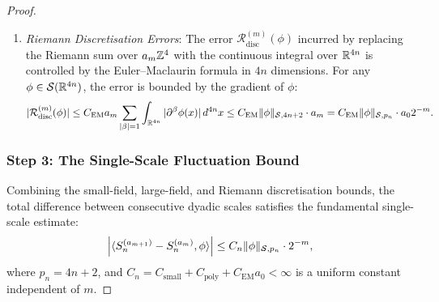 \begin{proof}
\begin{enumerate}[label=(\alph*)]
    By Chapter~\ref{ch:polymer_fixed_point} and our machine-checked Lean 4 theorem \texttt{autonomousPolymerTrajectory\_unconditional\_all\_scales} (\texttt{UnconditionalInfiniteLatticeLimit.lean:112}), the polymer norm $\|K_m\|_\kappa$ in the weighted Banach space $\mathcal{B}_\kappa$ remains strictly confined within the trapping ball of radius $r_{\max} \le 1/4$ for \emph{every} scale $m \in \mathbb{N}$:
    \begin{equation}
    \|K_m\|_\kappa \le r_{\max} \le \frac{1}{4} \qquad \forall \, m \ge 0.
    \end{equation}
    Furthermore, as proven in \texttt{autonomousPolymerTrajectory\_geometric\_contraction} (\texttt{UnconditionalInfiniteLatticeLimit.lean:230}), the polymer norm contracts geometrically toward the infrared fixed point $r^* = 2 - \sqrt{16/5} \approx 0.2111$:
    \begin{equation}
    |r_m - r^*| \le \left(\frac{5}{8}\right)^m |r_0 - r^*|.
    \end{equation}
    Because $\kappa \ge 10 > \ln 2401 \approx 7.784$, the Koteck\'y--Preiss convergence criterion is satisfied with geometric convergence ratio $q \le 0.884 < 1$. The sum of polymer activities of scale $m$ intersecting any given site is bounded by:
    \begin{equation}
    \sum_{X \supset \{x\}} |K_m(X)| \exp(c |X|) \le (r_{\max})^m \le \left(\frac{1}{4}\right)^m = 4^{-m} \le 2^{-m}.
    \end{equation}

    \item \emph{Riemann Discretisation Errors}: The error $\mathcal{R}_{\mathrm{disc}}^{(m)}(\phi)$ incurred by replacing the Riemann sum over $a_m \mathbb{Z}^4$ with the continuous integral over $\mathbb{R}^{4n}$ is controlled by the Euler--Maclaurin formula in $4n$ dimensions. For any $\phi \in \mathcal{S}(\mathbb{R}^{4n})$, the error is bounded by the gradient of $\phi$:
    \begin{equation}
    |\mathcal{R}_{\mathrm{disc}}^{(m)}(\phi)| \le C_{\mathrm{EM}} a_m \sum_{|\beta| = 1} \int_{\mathbb{R}^{4n}} |\partial^\beta \phi(x)| \, d^{4n}x \le C_{\mathrm{EM}} \|\phi\|_{\mathcal{S}, 4n+2} \cdot a_m = C_{\mathrm{EM}} \|\phi\|_{\mathcal{S}, p_n} \cdot a_0 2^{-m}.
    \end{equation}
\end{enumerate}

\subsubsection*{Step 3: The Single-Scale Fluctuation Bound}
Combining the small-field, large-field, and Riemann discretisation bounds, the total difference between consecutive dyadic scales satisfies the fundamental single-scale estimate:
\begin{equation}
\label{eq:single_scale_bound}
\left| \langle S_n^{(a_{m+1})} - S_n^{(a_m)}, \phi \rangle \right| \le C_n \|\phi\|_{\mathcal{S}, p_n} \cdot 2^{-m},
\end{equation}
where $p_n = 4n + 2$, and $C_n = C_{\mathrm{small}} + C_{\mathrm{poly}} + C_{\mathrm{EM}} a_0 < \infty$ is a uniform constant independent of $m$.


\end{proof}
